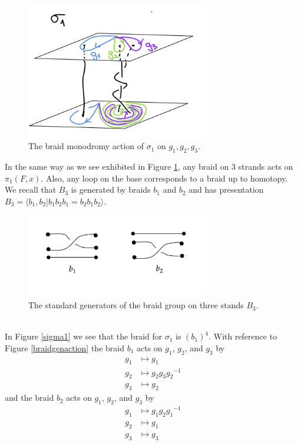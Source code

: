 \documentclass[oneside]{amsart}
\theoremstyle{definition}
\theoremstyle{definition}
\theoremstyle{definition}
\theoremstyle{definition}
\begin{document}
\begin{figure}[!h]
    \centering
    \includegraphics[width=8cm]{rank2exmp/braidaction1.png}
    \caption{The braid monodromy action of $\sigma_1$ on $g_1,g_2,g_3$.}
    \label{braidaction1}
\end{figure}
In the same way as we see exhibited in Figure \ref{braidaction1}, any braid on 3 strands acts on $\pi_1(F,x)$. Also, any loop on the base corresponds to a braid up to homotopy. We recall that $B_3$ is generated by braids $b_1$ and $b_2$ and has presentation $B_3 = \langle b_1,b_2 | b_1 b_2 b_1 = b_2 b_1 b_2\rangle$.
\begin{figure}[!h]
    \centering
    \includegraphics[width=8cm]{rank2exmp/B3.png}
    \caption{The standard generators of the braid group on three stands $B_3$.}
    \label{braidgenerators}
\end{figure}\\
\newline
In Figure \ref{sigma1} we see that the braid for $\sigma_1$ is $(b_1)^4$. With reference to Figure \ref{braidgenaction} the braid $b_1$ acts on $g_1$, $g_2$, and $g_3$ by
\begin{align*}
    g_1 &\mapsto g_1 \\
    g_2 &\mapsto g_2 g_3 {g_2}^{-1} \\
    g_3 &\mapsto g_2 
\end{align*}
and the braid $b_2$ acts on $g_1$, $g_2$, and $g_3$ by
\begin{align*}
    g_1 &\mapsto g_1 g_2 {g_1}^{-1} \\
    g_2 &\mapsto g_1 \\
    g_3 &\mapsto g_3
\end{align*}
\end{document}
